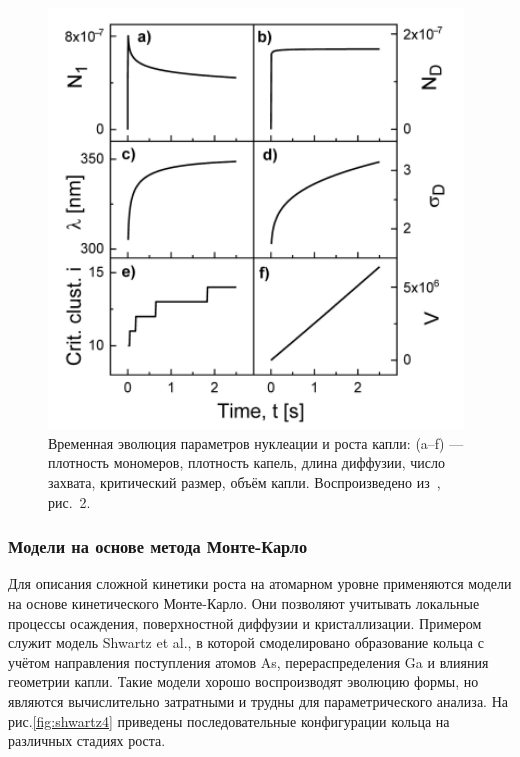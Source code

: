 \documentclass[14pt,oneside]{extarticle}
\begin{document}
\begin{figure}[H]
    \begin{center}
        \includegraphics[width=11cm]{images/dubrovskii_fig2.png}
        \caption{\label{fig:dubrovskii_model}
            Временная эволюция параметров нуклеации и роста капли: (a--f) — плотность мономеров, плотность капель, длина диффузии, число захвата, критический размер, объём капли. Воспроизведено из~\cite{dubrovskii2021}, рис.~2.}
    \end{center}
\end{figure}

\subsubsection*{Модели на основе метода Монте-Карло}
Для описания сложной кинетики роста на атомарном уровне применяются модели на основе кинетического Монте-Карло. Они позволяют учитывать локальные процессы осаждения, поверхностной диффузии и кристаллизации. Примером служит модель Shwartz et al.\cite{shwartz2018}, в которой смоделировано образование кольца с учётом направления поступления атомов As, перераспределения Ga и влияния геометрии капли. Такие модели хорошо воспроизводят эволюцию формы, но являются вычислительно затратными и трудны для параметрического анализа. На рис.\ref{fig:shwartz4} приведены последовательные конфигурации кольца на различных стадиях роста.
\end{document}
